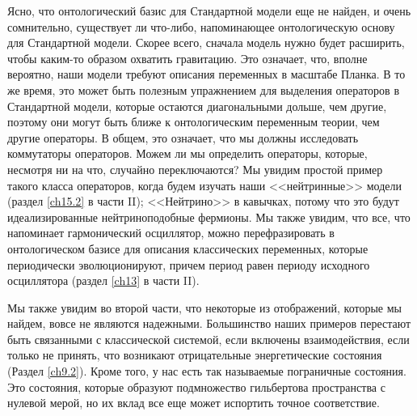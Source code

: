 \documentclass[main.tex]{subfiles}
\begin{document}
Ясно, что онтологический базис для Стандартной модели еще не найден, и очень сомнительно, существует ли что-либо, напоминающее онтологическую основу для Стандартной модели. Скорее всего, сначала модель нужно будет расширить, чтобы каким-то образом охватить гравитацию. Это означает, что, вполне вероятно, наши модели требуют описания переменных в масштабе Планка. В то же время, это может быть полезным упражнением для выделения операторов в Стандартной модели, которые остаются диагональными дольше, чем другие, поэтому они могут быть ближе к онтологическим переменным теории, чем другие операторы. В общем, это означает, что мы должны исследовать коммутаторы операторов. Можем ли мы определить операторы, которые, несмотря ни на что, случайно переключаются? Мы увидим простой пример такого класса операторов, когда будем изучать наши <<нейтринные>> модели (раздел \ref{ch15.2} в части II); <<Нейтрино>> в кавычках, потому что это будут идеализированные нейтриноподобные фермионы. Мы также увидим, что все, что напоминает гармонический осциллятор, можно перефразировать в онтологическом базисе для описания классических переменных, которые периодически эволюционируют, причем период равен периоду исходного осциллятора (раздел \ref{ch13} в части II).

Мы также увидим во второй части, что некоторые из отображений, которые мы найдем, вовсе не являются надежными. Большинство наших примеров перестают быть связанными с классической системой, если включены взаимодействия, если только не принять, что возникают отрицательные энергетические состояния (Раздел \ref{ch9.2}). Кроме того, у нас есть так называемые пограничные состояния. Это состояния, которые образуют подмножество гильбертова пространства с нулевой мерой, но их вклад все еще может испортить точное соответствие.
\end{document}
